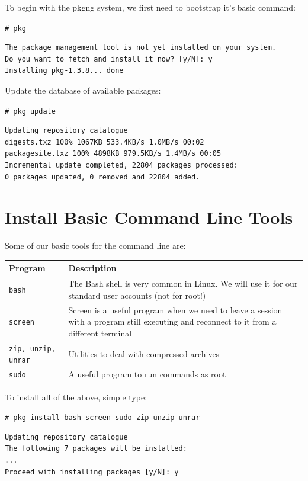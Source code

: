 \documentclass[a4paper,twoside,12pt]{article}
\newcommand{\coderoot}[1]{\texttt{\# #1}}
\newcommand{\code}[1]{\texttt{#1}}
\begin{document}
To begin with the pkgng system, we first need to bootstrap it's basic command:

\coderoot{pkg}

\begin{verbatim}
The package management tool is not yet installed on your system.
Do you want to fetch and install it now? [y/N]: y
Installing pkg-1.3.8... done
\end{verbatim}

Update the database of available packages:

\coderoot{pkg update}

\begin{verbatim}
Updating repository catalogue
digests.txz 100% 1067KB 533.4KB/s 1.0MB/s 00:02
packagesite.txz 100% 4898KB 979.5KB/s 1.4MB/s 00:05
Incremental update completed, 22804 packages processed:
0 packages updated, 0 removed and 22804 added.
\end{verbatim}

\section{Install Basic Command Line Tools}

Some of our basic tools for the command line are:

\begin{longtable}{|l|l|}
\hline
\textbf{Program} & \textbf{Description} \\
\hline
\endhead
\hline
\code{bash} & The Bash shell is very common in Linux. We will use it for our standard user accounts (not for root!) \\
\hline
\code{screen} & Screen is a useful program when we need to leave a session with a program still executing and reconnect to it from a different terminal \\
\hline
\code{zip, unzip, unrar} & Utilities to deal with compressed archives \\
\hline
\code{sudo} & A useful program to run commands as root \\
\hline
\end{longtable}
%
To install all of the above, simple type:

\coderoot{pkg install bash screen sudo zip unzip unrar}

\begin{verbatim}
Updating repository catalogue
The following 7 packages will be installed:
...
Proceed with installing packages [y/N]: y
\end{verbatim}
\end{document}
